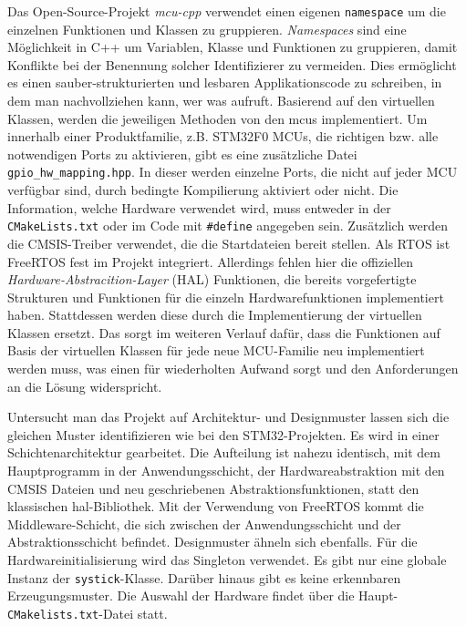 Das Open-Source-Projekt \emph{mcu-cpp} \cite{github_mcu_cpp} verwendet einen eigenen \texttt{namespace} um die einzelnen Funktionen und Klassen zu gruppieren.
\emph{Namespaces} sind eine Möglichkeit in C++ um Variablen, Klasse und Funktionen zu gruppieren, damit Konflikte bei der Benennung solcher Identifizierer zu vermeiden.
Dies ermöglicht es einen sauber-strukturierten und lesbaren Applikationscode zu schreiben, in dem man nachvollziehen kann, wer was aufruft.
Basierend auf den virtuellen Klassen, werden die jeweiligen Methoden von den \gls{mcu}s implementiert.
Um innerhalb einer Produktfamilie, z.B. STM32F0 MCUs, die richtigen bzw. alle notwendigen Ports zu aktivieren, gibt es eine zusätzliche Datei \texttt{gpio\_hw\_mapping.hpp}.
In dieser werden einzelne Ports, die nicht auf jeder MCU verfügbar sind, durch bedingte Kompilierung aktiviert oder nicht.
Die Information, welche Hardware verwendet wird, muss entweder in der \texttt{CMakeLists.txt} oder im Code mit \texttt{\#define} angegeben sein.
Zusätzlich werden die CMSIS-Treiber verwendet, die die Startdateien bereit stellen.
Als RTOS ist FreeRTOS fest im Projekt integriert.
Allerdings fehlen hier die offiziellen \emph{Hardware-Abstracition-Layer} (HAL) Funktionen, die bereits vorgefertigte Strukturen und Funktionen für die einzeln Hardwarefunktionen implementiert haben.
Stattdessen werden diese durch die Implementierung der virtuellen Klassen ersetzt.
Das sorgt im weiteren Verlauf dafür, dass die Funktionen auf Basis der virtuellen Klassen für jede neue MCU-Familie neu implementiert werden muss, was einen für wiederholten Aufwand sorgt und den Anforderungen an die Lösung widerspricht.

Untersucht man das Projekt auf Architektur- und Designmuster lassen sich die gleichen Muster identifizieren wie bei den STM32-Projekten.
Es wird in einer Schichtenarchitektur gearbeitet.
Die Aufteilung ist nahezu identisch, mit dem Hauptprogramm in der Anwendungsschicht, der Hardwareabstraktion mit den CMSIS Dateien und neu geschriebenen Abstraktionsfunktionen, statt den klassischen \gls{hal}-Bibliothek.
Mit der Verwendung von FreeRTOS kommt die Middleware-Schicht, die sich zwischen der Anwendungsschicht und der Abstraktionsschicht befindet.
Designmuster ähneln sich ebenfalls.
Für die Hardwareinitialisierung wird das Singleton verwendet.
Es gibt nur eine globale Instanz der \texttt{systick}-Klasse.
Darüber hinaus gibt es keine erkennbaren Erzeugungsmuster.
Die Auswahl der Hardware findet über die Haupt-\texttt{CMakelists.txt}-Datei statt.

